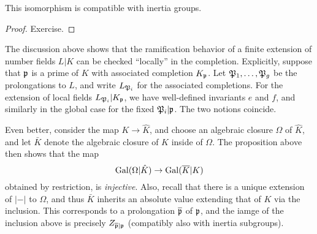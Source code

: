 \begin{proposition}
  This isomorphism is compatible with inertia groups.
\end{proposition}
\begin{proof}
  Exercise.
\end{proof}

The discussion above shows that the ramification behavior of a finite extension of number fields $L|K$ can be checked ``locally'' in the completion.
Explicitly, suppose that $\mathfrak{p}$ is a prime of $K$ with associated completion $K_{\mathfrak{p}}$.
Let $\mathfrak{P}_{1},\ldots,\mathfrak{P}_{g}$ be the prolongations to $L$, and write $L_{\mathfrak{P}_{i}}$ for the associated completions.
For the extension of local fields $L_{\mathfrak{P}_{i}}|K_{\mathfrak{p}}$, we have well-defined invariants $e$ and $f$, and similarly in the global case for the fixed $\mathfrak{P}_{i}|\mathfrak{p}$.
The two notions coincide.

Even better, consider the map $K \to \hat K$, and choose an algebraic closure $\Omega$ of $\hat K$, and let $\bar K$ denote the algebraic closure of $K$ inside of $\Omega$.
The proposition above then shows that the map
\[ \operatorname{Gal}(\Omega|\hat K) \to \operatorname{Gal}(\overline K|K) \]
obtained by restriction, is \emph{injective}.
Also, recall that there is a unique extension of $|-|$ to $\Omega$, and thus $\bar K$ inherits an absolute value extending that of $K$ via the inclusion.
This corresponds to a prolongation $\overline {\mathfrak{p}}$ of $\mathfrak{p}$, and the iamge of the inclusion above is precisely $Z_{\overline{\mathfrak{p}}|\mathfrak{p}}$ (compatibly also with inertia subgroups).

